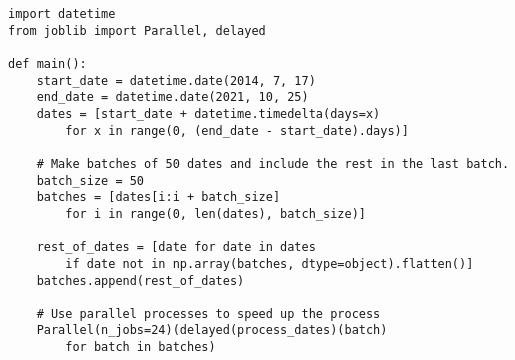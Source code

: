 \clearpage
\begin{code}
\begin{verbatim}
import datetime
from joblib import Parallel, delayed

def main():
    start_date = datetime.date(2014, 7, 17)
    end_date = datetime.date(2021, 10, 25)
    dates = [start_date + datetime.timedelta(days=x)
        for x in range(0, (end_date - start_date).days)]

    # Make batches of 50 dates and include the rest in the last batch.
    batch_size = 50
    batches = [dates[i:i + batch_size]
        for i in range(0, len(dates), batch_size)]

    rest_of_dates = [date for date in dates
        if date not in np.array(batches, dtype=object).flatten()]
    batches.append(rest_of_dates)

    # Use parallel processes to speed up the process
    Parallel(n_jobs=24)(delayed(process_dates)(batch)
        for batch in batches)
\end{verbatim}
\label{lst:RasterisierungMainFunction}
\end{code}